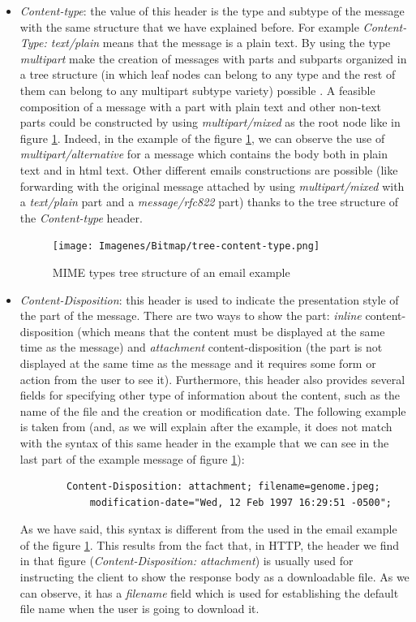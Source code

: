 \begin{itemize}
	\item\textit{Content-type}: the value of this header is the type and subtype of the message with the same structure that we have explained before. For example \textit{Content-Type: text/plain} means that the message is a plain text. By using the type \textit{multipart} make the creation of messages with parts and subparts organized in a tree structure (in which leaf nodes can belong to any type and the rest of them can belong to any multipart subtype variety) possible \citep{rfcmimemult}. A feasible composition of a message with a part with plain text and other non-text parts could be constructed by using \textit{multipart/mixed} as the root node like in figure \ref{fig:content-type}. Indeed, in the example of the figure \ref{fig:content-type}, we can observe the use of \textit{multipart/alternative} for a message which contains the body both in plain text and in html text. Other different emails constructions are possible (like forwarding with the original message attached by using \textit{multipart/mixed} with a \textit{text/plain} part and a \textit{message/rfc822} part) thanks to the tree structure of the \textit{Content-type} header.
	
	\begin{figure}[t]
		\centering%
		\texttt{[image: Imagenes/Bitmap/tree-content-type.png]}%
		\caption{MIME types tree structure of an email example}%
		\label{fig:content-type}
	\end{figure}
	\item\textit{Content-Disposition}: this header is used to indicate the presentation style of the part of the message. There are two ways to show the part: \textit{inline} content-disposition (which means that the content must be displayed at the same time as the message) and \textit{attachment} content-disposition (the part is not displayed at the same time as the message and it requires some form or action from the user to see it). Furthermore, this header also provides several fields for specifying other type of information about the content, such as the name of the file and the creation or modification date. The following example is taken from \cite{rfc2183} (and, as we will explain after the example, it does not match with the syntax of this same header in the example that we can see in the last part of the example message of figure \ref{fig:content-type}):
	\begin{lstlisting}
		Content-Disposition: attachment; filename=genome.jpeg;
			modification-date="Wed, 12 Feb 1997 16:29:51 -0500";
	\end{lstlisting}
	As we have said, this syntax is different from the used in the email example of the figure \ref{fig:content-type}. This results from the fact that, in HTTP, the header we find in that figure (\textit{Content-Disposition: attachment}) is usually used for instructing the client to show the response body as a downloadable file. As we can observe, it has a \textit{filename} field which is used for establishing the default file name when the user is going to download it.
	

\end{itemize}
